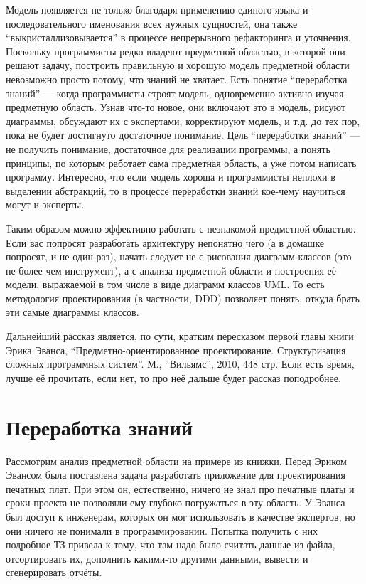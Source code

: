 \documentclass[a5paper]{article}
\begin{document}
Модель появляется не только благодаря применению единого языка и последовательного именования всех нужных сущностей, она также ``выкристаллизовывается'' в процессе непрерывного рефакторинга и уточнения. Поскольку программисты редко владеют предметной областью, в которой они решают задачу, построить правильную и хорошую модель предметной области невозможно просто потому, что знаний не хватает. Есть понятие ``переработка знаний'' --- когда программисты строят модель, одновременно активно изучая предметную область. Узнав что-то новое, они включают это в модель, рисуют диаграммы, обсуждают их с экспертами, корректируют модель, и т.д. до тех пор, пока не будет достигнуто достаточное понимание. Цель ``переработки знаний'' --- не получить понимание, достаточное для реализации программы, а понять принципы, по которым работает сама предметная область, а уже потом написать программу. Интересно, что если модель хороша и программисты неплохи в выделении абстракций, то в процессе переработки знаний кое-чему научиться могут и эксперты.

Таким образом можно эффективно работать с незнакомой предметной областью. Если вас попросят разработать архитектуру непонятно чего (а в домашке попросят, и не один раз), начать следует не с рисования диаграмм классов (это не более чем инструмент), а с анализа предметной области и построения её модели, выражаемой в том числе в виде диаграмм классов UML. То есть методология проектирования (в частности, DDD) позволяет понять, откуда брать эти самые диаграммы классов.

Дальнейший рассказ является, по сути, кратким пересказом первой главы книги Эрика Эванса, ``Предметно-ориентированное проектирование. Структуризация сложных программных систем''. М., ``Вильямс'', 2010, 448 стр. Если есть время, лучше её прочитать, если нет, то про неё дальше будет рассказ поподробнее.

\section{Переработка знаний}

Рассмотрим анализ предметной области на примере из книжки. Перед Эриком Эвансом была поставлена задача разработать приложение для проектирования печатных плат. При этом он, естественно, ничего не знал про печатные платы и сроки проекта не позволяли ему глубоко погружаться в эту область. У Эванса был доступ к инженерам, которых он мог использовать в качестве экспертов, но они ничего не понимали в программировании. Попытка получить с них подробное ТЗ привела к тому, что там надо было считать данные из файла, отсортировать их, дополнить какими-то другими данными, вывести и сгенерировать отчёты.
\end{document}
